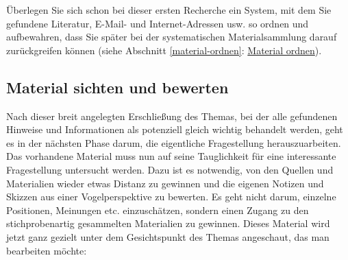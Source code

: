 \documentclass[]{book}
\theoremstyle{definition}
\theoremstyle{definition}
\theoremstyle{definition}
\theoremstyle{remark}
\begin{document}
Überlegen Sie sich schon bei dieser ersten Recherche ein System, mit dem
Sie gefundene Literatur, E-Mail- und Internet-Adressen usw. so ordnen
und aufbewahren, dass Sie später bei der systematischen Materialsammlung
darauf zurückgreifen können (siehe Abschnitt \ref{material-ordnen}:
\protect\hyperlink{material-ordnen}{Material ordnen}).

\subsection{Material sichten und
bewerten}\label{material-sichten-und-bewerten}

Nach dieser breit angelegten Erschließung des Themas, bei der alle
gefundenen Hinweise und Informationen als potenziell gleich wichtig
behandelt werden, geht es in der nächsten Phase darum, die eigentliche
Fragestellung herauszuarbeiten. Das vorhandene Material muss nun auf
seine Tauglichkeit für eine interessante Fragestellung untersucht
werden. Dazu ist es notwendig, von den Quellen und Materialien wieder
etwas Distanz zu gewinnen und die eigenen Notizen und Skizzen aus einer
Vogelperspektive zu bewerten. Es geht nicht darum, einzelne Positionen,
Meinungen etc. einzuschätzen, sondern einen Zugang zu den
stichprobenartig gesammelten Materialien zu gewinnen. Dieses Material
wird jetzt ganz gezielt unter dem Gesichtspunkt des Themas angeschaut,
das man bearbeiten möchte:
\end{document}
